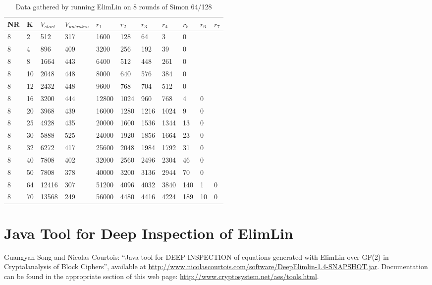 \begin{table}[h!]
	\centering
	\caption{Data gathered by running ElimLin on 8 rounds of Simon 64/128}
	\label{tbl:fullResultsSecrypt20168R}
	\begin{tabular}{lllllllllll}
		NR & K & $V_{start}$ & $V_{unbroken}$ & $r_1$   & $r_2$  & $r_3$  & $r_4$ & $r_5$ & $r_6$ & $r_7$ \\ \hline
		8  & 2 & 512    & 317       & 1600 & 128 & 64  & 3  & 0  &    &    \\
		8  & 4 & 896    & 409       & 3200 & 256 & 192 & 39 & 0  &    &    \\
		8  & 8 & 1664    & 443       & 6400 & 512 & 448 & 261 & 0  &    &   \\
		8 & 10 & 2048    & 448       & 8000 & 640 & 576  & 384  & 0  &    &    \\
		8 & 12 & 2432    & 448       & 9600 & 768 & 704 & 512 & 0  &    &    \\
		8  & 16 & 3200   & 444       & 12800 & 1024 & 960 & 768 & 4  &   0 &   \\
		8  & 20 & 3968    & 439       & 16000 & 1280 & 1216  & 1024  & 9 &   0 &    \\
		8 & 25 & 4928    & 435       & 20000 & 1600 & 1536 & 1344 & 13  &  0  &    \\
		8  & 30 & 5888    & 525       & 24000 & 1920 & 1856 & 1664 & 23  & 0   &   \\
		8 & 32 & 6272    & 417       & 25600 & 2048 & 1984 & 1792 & 31  &  0  &    \\
		8  & 40 & 7808    & 402       & 32000 & 2560 & 2496 & 2304 & 46  & 0   &   \\
		8 & 50 & 7808    & 378       & 40000 & 3200 & 3136 & 2944 & 70  &  0  &    \\
		8  & 64 & 12416    & 307       & 51200 & 4096 & 4032  & 3840  & 140  &  1  & 0   \\
		8  & 70 & 13568    & 249       & 56000 & 4480 & 4416 & 4224 & 189  & 10   & 0    
		
	\end{tabular}
\end{table}
\chapter{Java Tool for Deep Inspection of ElimLin} \label{deepLin}
Guangyan Song and Nicolas Courtois:
``Java tool for DEEP INSPECTION of equations generated with ElimLin over GF(2)
in Cryptalanalysis of Block Ciphers'',
available at
\url{http://www.nicolascourtois.com/software/DeepElimlin-1.4-SNAPSHOT.jar}. Documentation can be found in the appropriate section of this web page:
\url{http://www.cryptosystem.net/aes/tools.html}.

